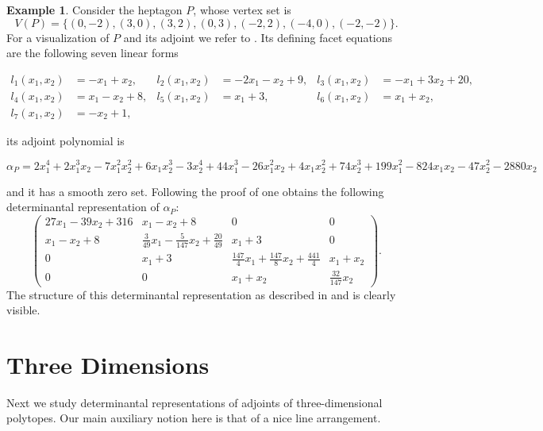 \documentclass[a4paper,10pt]{amsart}
\theoremstyle{definition}
\newtheorem{ex}[Def]{Example}
\theoremstyle{plain}
\begin{document}
\begin{ex} \label{ex:planar}
    Consider the heptagon $P$, whose vertex set is
    \begin{equation*}
        V(P) = \{(0,-2),(3,0),(3,2),(0,3),(-2,2),(-4,0),(-2,-2)\}.
    \end{equation*}
    For a visualization of $P$ and its adjoint we refer to . Its defining facet equations are the following seven linear forms
    \begin{small}
    \begin{align*}
        l_1(x_1,x_2) &= -x_1+x_2,& l_2(x_1, x_2) &= -2x_1-x_2+9, & l_3(x_1, x_2) &= -x_1+3x_2+20,\\
        l_4(x_1, x_2) &= x_1-x_2+8,& l_5(x_1, x_2) &= x_1+3,&l_6(x_1, x_2) &= x_1+x_2,\\
        l_7(x_1,x_2) &= -x_2+1,&&&&
    \end{align*}
    \end{small}its adjoint polynomial is
    \begin{tiny}
    \begin{equation*}
    \alpha_P = 2x_1^4+2x_1^3x_2-7x_1^2x_2^2+6x_1x_2^3-3x_2^4+44x_1^3-26x_1^2x_2+4x_1x_2^2+74x_2^3+199x_1^2-824x_1x_2-47x_2^2-2880x_2
    \end{equation*}
    \end{tiny}and it has a smooth zero set.
    Following the proof of  one obtains the following determinantal representation of $\alpha_P$:
    \begin{equation*}
        \begin{pmatrix}
            27x_1-39x_2+316 & x_1 - x_2 + 8 & 0 & 0 \\
            x_1 - x_2 + 8 & \frac{3}{49}x_1 - \frac{5}{147}x_2+\frac{20}{49} & x_1+3 & 0 \\
            0 & x_1+3 & \frac{147}{4}x_1 + \frac{147}{8}x_2 + \frac{441}{4} & x_1 + x_2 \\
            0 & 0 & x_1 + x_2 & \frac{32}{147}x_2
        \end{pmatrix}.
    \end{equation*}
The structure of this determinantal representation as described in  and  is clearly visible.
\end{ex}

\section{Three Dimensions} \label{sec:4}\label{sec:detreps3d}
Next we study determinantal representations of adjoints of three-dimensional polytopes. Our main auxiliary notion here is that of a {nice} line arrangement.
\end{document}

